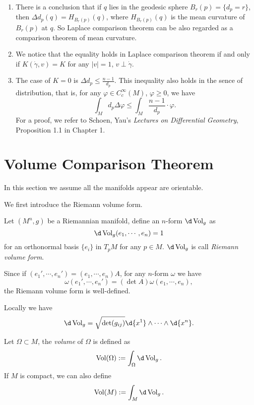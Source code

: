 \begin{rem}
    \begin{enumerate}[(1)]
        \item There is a conclusion that if $q$ lies in the geodesic sphere $B_r(p)=\{d_p=r\}$, then $\Delta d_p(q)=H_{B_r(p)}(q)$, where $H_{B_r(p)}(q)$ is the mean curvature of $B_r(p)$ at $q$.
        So Laplace comparison theorem can be also regarded as a comparison theorem of mean curvature.
        \item We notice that the equality holds in Laplace comparison theorem if and only if $K(\dot{\gamma},v)=K$ for any $|v|=1$, $v\perp\dot{\gamma}$.
        \item The case of $K=0$ is $\Delta d_p\leq\frac{n-1}{d_p}$.
        This inequality also holds in the sence of distribution, that is, for any $\varphi\in C^\infty_c(M)$, $\varphi\geq 0$, we have
        \[\int_Md_p\Delta\varphi\leq\int_M\frac{n-1}{d_p}\cdot\varphi.\]
        For a proof, we refer to Schoen, Yau's \emph{Lectures on Differential Geometry}, Proposition 1.1 in Chapter 1.
    \end{enumerate}
\end{rem}

\section{Volume Comparison Theorem}
In this section we assume all the manifolds appear are orientable.

We first introduce the Riemann volume form.
\begin{defn}
    Let $(M^n,g)$ be a Riemannian manifold, define an $n$-form $\d\Vol_g$ as 
    \[\d\Vol_g(e_1,\cdots,e_n)=1\]
    for an orthonormal basis $\{e_i\}$ in $T_pM$ for any $p\in M$.
    $\d\Vol_g$ is call \emph{Riemann volume form}.
\end{defn}

Since if $(e_1',\cdots,e_n')=(e_1,\cdots,e_n)A$, for any $n$-form $\omega$ we have
\[\omega(e_1',\cdots,e_n')=(\det{A})\omega(e_1,\cdots,e_n),\]
the Riemann volume form is well-defined.

Locally we have
\[\d\Vol_g=\sqrt{\det(g_{ij})}\d{x^1}\wedge\cdots\wedge\d{x^n}.\]

\begin{defn}
    Let $\Omega\subset M$, the \emph{volume} of $\Omega$ is defined as
    \[\Vol(\Omega):=\int_\Omega\d\Vol_g.\]
    If $M$ is compact, we can also define
    \[\Vol(M):=\int_M\d\Vol_g.\]
\end{defn}

